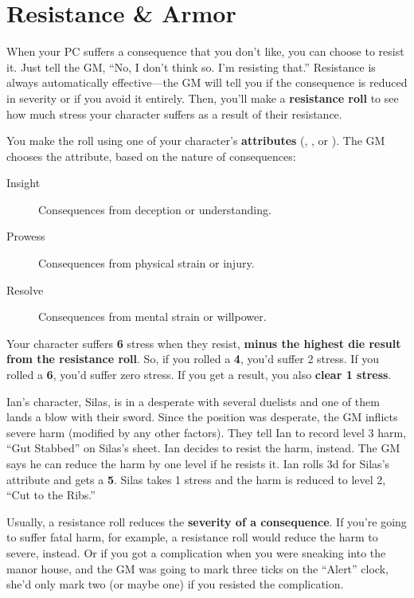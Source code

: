 \section{Resistance \& Armor}

When your PC suffers a consequence that you don’t like, you can choose to resist it. Just tell the GM, “No, I don’t think so. I’m resisting that.” Resistance is always automatically effective—the GM will tell you if the consequence is reduced in severity or if you avoid it entirely. Then, you’ll make a \textbf{resistance roll} to see how much stress your character suffers as a result of their resistance.

You make the roll using one of your character’s \textbf{attributes} (, , or ). The GM chooses the attribute, based on the nature of consequences:

\begin{description}
\item[Insight] Consequences from deception or understanding.
\item[Prowess] Consequences from physical strain or injury.
\item[Resolve] Consequences from mental strain or willpower.
\end{description}

Your character suffers \textbf{6} stress when they resist, \textbf{minus the highest die result from the resistance roll}. So, if you rolled a \textbf{4}, you’d suffer 2 stress. If you rolled a \textbf{6}, you’d suffer zero stress. If you get a  result, you also \textbf{clear 1 stress}.

\begin{qb}Ian’s character, Silas, is in a desperate  with several duelists and one of them lands a blow with their sword. Since the position was desperate, the GM inflicts severe harm (modified by any other factors). They tell Ian to record level 3 harm, ``Gut Stabbed'' on Silas’s sheet. Ian decides to resist the harm, instead. The GM says he can reduce the harm by one level if he resists it. Ian rolls 3d for Silas’s  attribute and gets a \textbf{5}. Silas takes 1 stress and the harm is reduced to level 2, “Cut to the Ribs.”\end{qb}

Usually, a resistance roll reduces the \textbf{severity of a consequence}. If you’re going to suffer fatal harm, for example, a resistance roll would reduce the harm to severe, instead. Or if you got a complication when you were sneaking into the manor house, and the GM was going to mark three ticks on the “Alert” clock, she’d only mark two (or maybe one) if you resisted the complication.

